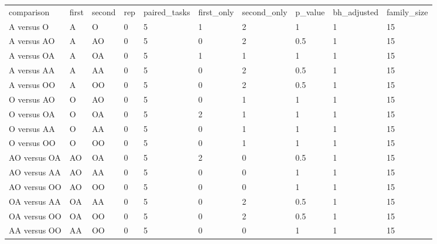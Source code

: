 \begin{tabular}{llllllllll}
comparison & first & second & rep & paired\_tasks & first\_only & second\_only & p\_value & bh\_adjusted & family\_size \\
A versus O & A & O & 0 & 5 & 1 & 2 & 1 & 1 & 15 \\
A versus AO & A & AO & 0 & 5 & 0 & 2 & 0.5 & 1 & 15 \\
A versus OA & A & OA & 0 & 5 & 1 & 1 & 1 & 1 & 15 \\
A versus AA & A & AA & 0 & 5 & 0 & 2 & 0.5 & 1 & 15 \\
A versus OO & A & OO & 0 & 5 & 0 & 2 & 0.5 & 1 & 15 \\
O versus AO & O & AO & 0 & 5 & 0 & 1 & 1 & 1 & 15 \\
O versus OA & O & OA & 0 & 5 & 2 & 1 & 1 & 1 & 15 \\
O versus AA & O & AA & 0 & 5 & 0 & 1 & 1 & 1 & 15 \\
O versus OO & O & OO & 0 & 5 & 0 & 1 & 1 & 1 & 15 \\
AO versus OA & AO & OA & 0 & 5 & 2 & 0 & 0.5 & 1 & 15 \\
AO versus AA & AO & AA & 0 & 5 & 0 & 0 & 1 & 1 & 15 \\
AO versus OO & AO & OO & 0 & 5 & 0 & 0 & 1 & 1 & 15 \\
OA versus AA & OA & AA & 0 & 5 & 0 & 2 & 0.5 & 1 & 15 \\
OA versus OO & OA & OO & 0 & 5 & 0 & 2 & 0.5 & 1 & 15 \\
AA versus OO & AA & OO & 0 & 5 & 0 & 0 & 1 & 1 & 15 \\
\end{tabular}
